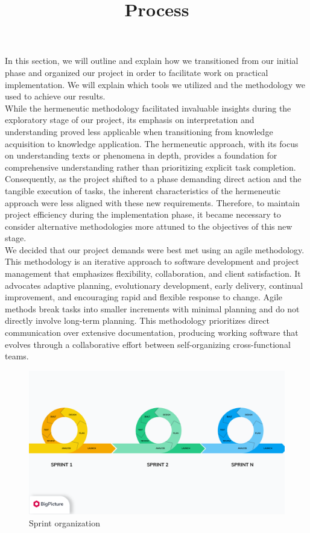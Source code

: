 \title{Process}

In this section, we will outline and explain how we transitioned from our initial phase and organized our project in order to facilitate work on practical implementation. We will explain which tools we utilized and the methodology we used to achieve our results.  \\

While the hermeneutic methodology facilitated invaluable insights during the exploratory stage of our project, its emphasis on interpretation and understanding proved less applicable when transitioning from knowledge acquisition to knowledge application. The hermeneutic approach, with its focus on understanding texts or phenomena in depth, provides a foundation for comprehensive understanding rather than prioritizing explicit task completion. Consequently, as the project shifted to a phase demanding direct action and the tangible execution of tasks, the inherent characteristics of the hermeneutic approach were less aligned with these new requirements. Therefore, to maintain project efficiency during the implementation phase, it became necessary to consider alternative methodologies more attuned to the objectives of this new stage.\\

We decided that our project demands were best met using an agile methodology. This methodology is an iterative approach to software development and project management that emphasizes flexibility, collaboration, and client satisfaction. It advocates adaptive planning, evolutionary development, early delivery, continual improvement, and encouraging rapid and flexible response to change. Agile methods break tasks into smaller increments with minimal planning and do not directly involve long-term planning. This methodology prioritizes direct communication over extensive documentation, producing working software that evolves through a collaborative effort between self-organizing cross-functional teams. \\

\begin{figure}[H]
    \centering
    \includegraphics[scale=0.25]{fig/sprints.png}
    \caption{Sprint organization \cite{sprintimage}}
\end{figure}


